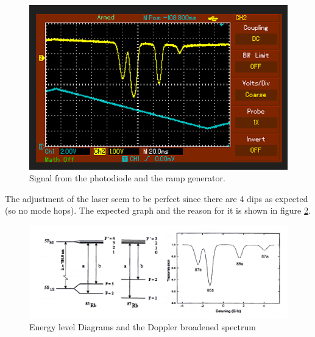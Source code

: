 \begin{figure}
    \centering
    \includegraphics[width=\textwidth]{BMP.png}
    \caption{Signal from the photodiode and the ramp generator.}
    \label{fig:ffl}
\end{figure}

\noindent
The adjustment of the laser seem to be perfect since there are 4 dips as expected (so no mode hops). The 
expected graph and the reason for it is shown in figure \ref{fig:lit}.

\begin{figure}
    \centering
    \includegraphics[width=\textwidth]{lit.png}
    \caption{Energy level Diagrams and the Doppler broadened spectrum \cite{V60}}
    \label{fig:lit}
\end{figure}

